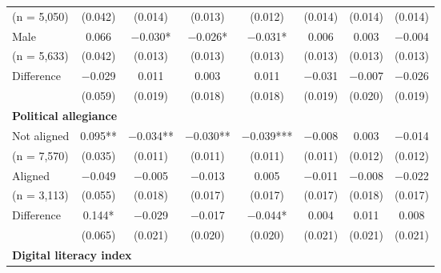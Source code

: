 \documentclass[letterpaper, 12pt, parskip=full,DIV=10]{scrartcl}
\begin{document}
\begin{table}[H]
{\begin{tabular}{lccccccc}
\hspace{1.5em} (n = 5,050) 	& (\num{0.042}) & (\num{0.014}) & (\num{0.013}) & (\num{0.012}) & (\num{0.014}) & (\num{0.014}) & (\num{0.014})\\
\hspace{1em} Male  			& \num{0.066} & \num{-0.030}* & \num{-0.026}* & \num{-0.031}* & \num{0.006} & \num{0.003} & \num{-0.004}\\
\hspace{1.5em}  (n = 5,633)	& (\num{0.042}) & (\num{0.013}) & (\num{0.013}) & (\num{0.013}) & (\num{0.013}) & (\num{0.013}) & (\num{0.013})\\
 \cmidrule(lr){2-8}
 \hspace{1em} Difference 			& \num{-0.029} & \num{0.011} & \num{0.003} & \num{0.011} & \num{-0.031} & \num{-0.007} & \num{-0.026}\\
 \hspace{1.5em} 				& (\num{0.059}) & (\num{0.019}) & (\num{0.018}) & (\num{0.018}) & (\num{0.019}) & (\num{0.020}) & (\num{0.019})\\  
 \multicolumn{4}{l}{\textbf{Political allegiance}} \rule{0pt}{1.2\normalbaselineskip}\\
\hspace{1em} Not aligned  		& \num{0.095}** & \num{-0.034}** & \num{-0.030}** & \num{-0.039}*** & \num{-0.008} & \num{0.003} & \num{-0.014}\\
\hspace{1.5em} (n = 7,570) 		& (\num{0.035}) & (\num{0.011}) & (\num{0.011}) & (\num{0.011}) & (\num{0.011}) & (\num{0.012}) & (\num{0.012})\\
\hspace{1em} Aligned  			& \num{-0.049} & \num{-0.005} & \num{-0.013} & \num{0.005} & \num{-0.011} & \num{-0.008} & \num{-0.022}\\
\hspace{1.5em} (n = 3,113)		& (\num{0.055}) & (\num{0.018}) & (\num{0.017}) & (\num{0.017}) & (\num{0.017}) & (\num{0.018}) & (\num{0.017})\\
  \cmidrule(lr){2-8}
 \hspace{1em} Difference 			& \num{0.144}* & \num{-0.029} & \num{-0.017} & \num{-0.044}* & \num{0.004} & \num{0.011} & \num{0.008}\\
\hspace{1.5em} 				& (\num{0.065}) & (\num{0.021}) & (\num{0.020}) & (\num{0.020}) & (\num{0.021}) & (\num{0.021}) & (\num{0.021})\\
 \multicolumn{4}{l}{\textbf{Digital literacy index }}  \rule{0pt}{1.2\normalbaselineskip}\\

\end{tabular}}
\end{table}
\end{document}
